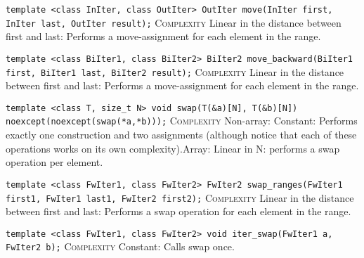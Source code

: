 \noindent{}\hspace*{0.25em}\lstinline[basicstyle=\ttfamily\color{corange}]{template <class InIter, class OutIter> OutIter move(InIter first, InIter last, OutIter result);} \textsc{Complexity} Linear in the distance between first and last: Performs a move-assignment for each element in the range.\\\vspace{-0.6em}

\noindent{}\hspace*{0.25em}\lstinline[basicstyle=\ttfamily\color{corange}]{template <class BiIter1, class BiIter2> BiIter2 move_backward(BiIter1 first, BiIter1 last, BiIter2 result);} \textsc{Complexity} Linear in the distance between first and last: Performs a move-assignment for each element in the range.\\\vspace{-0.6em}

\noindent{}\hspace*{0.25em}\lstinline[basicstyle=\ttfamily\color{corange}]{template <class T, size_t N> void swap(T(&a)[N], T(&b)[N]) noexcept(noexcept(swap(*a,*b)));} \textsc{Complexity} Non-array: Constant: Performs exactly one construction and two assignments (although notice that each of these operations works on its own complexity).Array: Linear in N: performs a swap operation per element.\\\vspace{-0.6em}

\noindent{}\hspace*{0.25em}\lstinline[basicstyle=\ttfamily\color{corange}]{template <class FwIter1, class FwIter2> FwIter2 swap_ranges(FwIter1 first1, FwIter1 last1, FwIter2 first2);} \textsc{Complexity} Linear in the distance between first and last: Performs a swap operation for each element in the range.\\\vspace{-0.6em}

\noindent{}\hspace*{0.25em}\lstinline[basicstyle=\ttfamily\color{cgreen}]{template <class FwIter1, class FwIter2> void iter_swap(FwIter1 a, FwIter2 b);} \textsc{Complexity} Constant: Calls swap once.\\\vspace{-0.6em}

